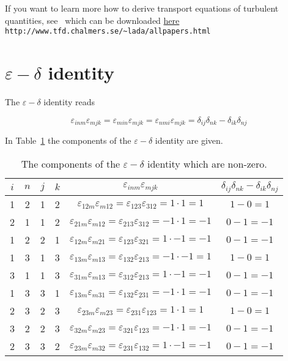 \documentclass[a4paper]{article}
\def\e{\varepsilon}
\def\e{\varepsilon}
\begin{document}
If you want to learn more how to derive transport equations of turbulent quantities,
see~\cite{davidson:transport:06} which can be downloaded
\href{http://www.tfd.chalmers.se/~lada/allpapers.html}{here}\\
{\tt http://www.tfd.chalmers.se/\textasciitilde lada/allpapers.html}



\appendix



\section{$\e-\delta$ identity}
%
%
%

The $\e-\delta$ identity reads

\begin{equation*}
 \e_{inm} \e_{mjk} = \e_{min} \e_{mjk} =  \e_{nmi} \e_{mjk} =\delta_{ij}\delta_{nk} - \delta_{ik}\delta_{nj}
\end{equation*}


In Table~\ref{eps-delta}  the components of the $\e-\delta$ identity are given.

\begin{table}[!t]
\begin{tabular}{|c|c|c|c|c|c|}\hline
$i$ & $n$ & $j$ & $k$ & $ \e_{inm} \e_{mjk}$ & $\delta_{ij}\delta_{nk} - \delta_{ik}\delta_{nj}$ \\ \hline
%
1   &  2  & 1   & 2   & $\e_{12m} \e_{m12}=\e_{123} \e_{312}= 1\cdot 1 = 1$ & $1-0=1$ \\
%
2   &  1  & 1   & 2   & $\e_{21m} \e_{m12}=\e_{213} \e_{312}= -1\cdot 1= - 1$ & $0 -1=-1$ \\
%
1   &  2  & 2   & 1   & $\e_{12m} \e_{m21}=\e_{123} \e_{321}= 1\cdot -1= - 1$ & $0-1=-1$ \\[0.3cm]
%
1   &  3  & 1   & 3   & $\e_{13m} \e_{m13}=\e_{132} \e_{213}= -1\cdot -1=  1$ & $1-0= 1$ \\
%
3   &  1  & 1   & 3   & $\e_{31m} \e_{m13}=\e_{312} \e_{213}= 1\cdot -1= - 1$ & $0-1=-1$ \\
%
1   &  3  & 3   & 1   & $\e_{13m} \e_{m31}=\e_{132} \e_{231}= -1\cdot 1= -1$ & $0-1=-1$ \\[0.3cm]
%
2   &  3  & 2   & 3   & $\e_{23m} \e_{m23}=\e_{231} \e_{123}= 1\cdot 1=  1$ & $1-0= 1$ \\
%
3   &  2  & 2   & 3   & $\e_{32m} \e_{m23}=\e_{321} \e_{123}=-1\cdot 1= -1$ & $0-1=-1$ \\
%
2   &  3  & 3   & 2   & $\e_{23m} \e_{m32}=\e_{231} \e_{132}= 1\cdot-1= -1$ & $0-1=-1$ \\ \hline
\end{tabular}
\caption{The components of the $\e-\delta$ identity which are non-zero.}
\label{eps-delta}
\end{table}





\end{document}
